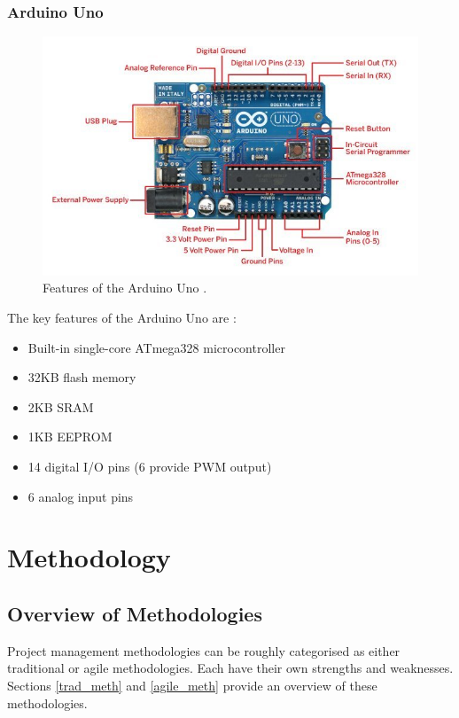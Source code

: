 \documentclass{UoYCSproject}
\begin{document}
\subsection{Arduino Uno}
\begin{figure}[h!]
  \includegraphics[width=\linewidth]{graphics/arduino_board.jpg}
  \caption{Features of the Arduino Uno \parencite{arduinodiagram}.}
  \label{fig:arduino_uno}
\end{figure}

The key features of the Arduino Uno are \parencite{arduinospec}:
\begin{itemize}
\item Built-in single-core ATmega328 microcontroller
\item 32KB flash memory
\item 2KB SRAM
\item 1KB EEPROM
\item 14 digital I/O pins (6 provide PWM output)
\item 6 analog input pins
\end{itemize}

\chapter{Methodology}
\section{Overview of Methodologies}
Project management methodologies can be roughly categorised as either traditional or agile methodologies. Each have their own strengths and weaknesses. Sections \ref{trad_meth} and \ref{agile_meth} provide an overview of these methodologies.
\end{document}
